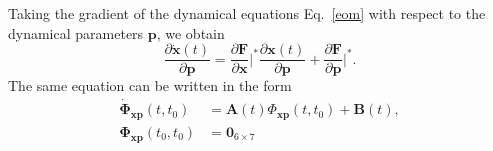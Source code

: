 \documentclass[lineno, pdflatex,sn-mathphys-ay]{sn-jnl}
\theoremstyle{thmstyleone}%
\theoremstyle{thmstyletwo}%
\theoremstyle{thmstylethree}%
\renewcommand{\vec}[1]{\boldsymbol{#1}}
\begin{document}
	
	Taking the gradient of the dynamical equations Eq.~\eqref{eom} with respect to the dynamical parameters \( \vec{p} \), we obtain
	\begin{equation}
		\frac{\partial \dot{\vec{x}}(t)}{\partial \vec{p}} = \frac{\partial \vec{F}}{\partial \vec{x}} \Bigg|^* \frac{\partial \vec{x}(t)}{\partial \vec{p}} + \frac{\partial \vec{F}}{\partial \vec{p}} \Bigg|^*.
		 \label{eq:22.33}
	\end{equation}
	The same equation can be written in the form
	\begin{subequations}
	\begin{align}
		\dot{\vec{\Phi}}_{\vec{xp}}(t, t_0) &= \vec{A}(t) \Phi_{\vec{xp}}(t, t_0) + \vec{B}(t), \\
		{\vec{\Phi}}_{\vec{xp}}(t_0, t_0) &= \vec{0}_{6\times 7} 
	\end{align}
	\end{subequations}
	
	
\end{document}
